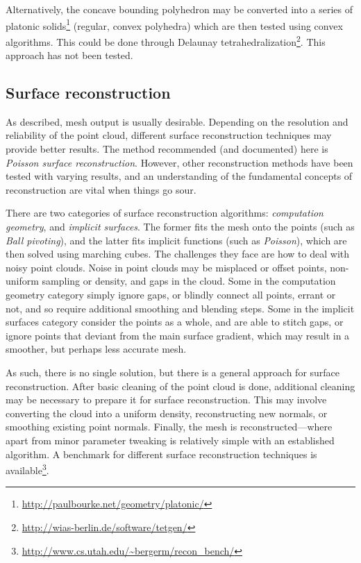 Alternatively, the concave bounding polyhedron may be converted into a series of platonic solids\footnote{\url{http://paulbourke.net/geometry/platonic/}} (regular, convex polyhedra) which are then tested using convex algorithms. This could be done through Delaunay tetrahedralization\footnote{\url{http://wias-berlin.de/software/tetgen/}}. This approach has not been tested.

\subsection{Surface reconstruction}
As described, mesh output is usually desirable. Depending on the resolution and reliability of the point cloud, different surface reconstruction techniques may provide better results. The method recommended (and documented) here is \emph{Poisson surface reconstruction}. However, other reconstruction methods have been tested with varying results, and an understanding of the fundamental concepts of reconstruction are vital when things go sour.

There are two categories of surface reconstruction algorithms: \emph{computation geometry}, and \emph{implicit surfaces}. The former fits the mesh onto the points (such as \emph{Ball pivoting}), and the latter fits implicit functions (such as \emph{Poisson}), which are then solved using marching cubes. The challenges they face are how to deal with noisy point clouds. Noise in point clouds may be misplaced or offset points, non-uniform sampling or density, and gaps in the cloud. Some in the computation geometry category simply ignore gaps, or blindly connect all points, errant or not, and so require additional smoothing and blending steps. Some in the implicit surfaces category consider the points as a whole, and are able to stitch gaps, or ignore points that deviant from the main surface gradient, which may result in a smoother, but perhaps less accurate mesh.

As such, there is no single solution, but there is a general approach for surface reconstruction. After basic cleaning of the point cloud is done, additional cleaning may be necessary to prepare it for surface reconstruction. This may involve converting the cloud into a uniform density, reconstructing new normals, or smoothing existing point normals. Finally, the mesh is reconstructed---where apart from minor parameter tweaking is relatively simple with an established algorithm. A benchmark for different surface reconstruction techniques is available\footnote{\url{http://www.cs.utah.edu/~bergerm/recon_bench/}}.

